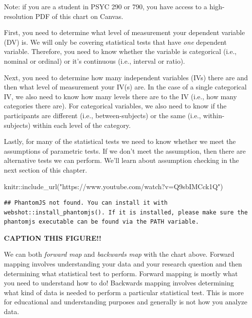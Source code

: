 \documentclass[
]{book}
\newenvironment{Shaded}{\begin{snugshade}}{\end{snugshade}}
\newcommand{\FunctionTok}[1]{\textcolor[rgb]{0.00,0.00,0.00}{#1}}
\newcommand{\NormalTok}[1]{#1}
\newcommand{\SpecialCharTok}[1]{\textcolor[rgb]{0.00,0.00,0.00}{#1}}
\newcommand{\StringTok}[1]{\textcolor[rgb]{0.31,0.60,0.02}{#1}}
\begin{document}
Note: if you are a student in PSYC 290 or 790, you have access to a high-resolution PDF of this chart on Canvas.

First, you need to determine what level of measurement your dependent variable (DV) is. We will only be covering statistical tests that have \emph{one} dependent variable. Therefore, you need to know whether the variable is categorical (i.e., nominal or ordinal) or it's continuous (i.e., interval or ratio).

Next, you need to determine how many independent variables (IVs) there are and then what level of measurement your IV(s) are. In the case of a single categorical IV, we also need to know how many levels there are to the IV (i.e., how many categories there are). For categorical variables, we also need to know if the participants are different (i.e., between-subjects) or the same (i.e., within-subjects) within each level of the category.

Lastly, for many of the statistical tests we need to know whether we meet the assumptions of parametric tests. If we don't meet the assumption, then there are alternative tests we can perform. We'll learn about assumption checking in the next section of this chapter.

\begin{Shaded}
\begin{Highlighting}[]
\NormalTok{knitr}\SpecialCharTok{::}\FunctionTok{include\_url}\NormalTok{(}\StringTok{"https://www.youtube.com/watch?v=Q9sbIMCck1Q"}\NormalTok{)}
\end{Highlighting}
\end{Shaded}

\begin{verbatim}
## PhantomJS not found. You can install it with webshot::install_phantomjs(). If it is installed, please make sure the phantomjs executable can be found via the PATH variable.
\end{verbatim}

\label{fig:unnamed-chunk-1}\textbf{CAPTION THIS FIGURE!!}

We can both \emph{forward map} and \emph{backwards map} with the chart above. Forward mapping involves understanding your data and your research question and then determining what statistical test to perform. Forward mapping is mostly what you need to understand how to do! Backwards mapping involves determining what kind of data is needed to perform a particular statistical test. This is more for educational and understanding purposes and generally is not how you analyze data.
\end{document}
